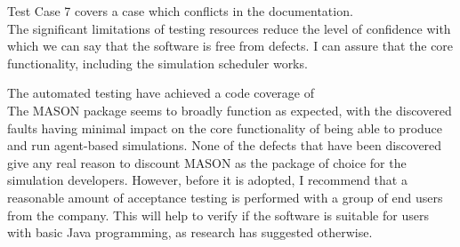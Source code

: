 \documentclass[11pt]{article}
\begin{document}
Test Case 7 covers a case which conflicts in the documentation.
\\

The significant limitations of testing resources reduce the level of confidence with which we can say that the software is free from defects.
I can assure that the core functionality, including the simulation scheduler works.

The automated testing have achieved a code coverage of 
\\



The MASON package seems to broadly function as expected, with the discovered faults having minimal impact on the core functionality of being able to produce and run agent-based simulations.
None of the defects that have been discovered give any real reason to discount MASON as the package of choice for the simulation developers.
However, before it is adopted, I recommend that a reasonable amount of acceptance testing is performed with a group of end users from the company.
This will help to verify if the software is suitable for users with basic Java programming, as research\cite{abm_platforms_review} has suggested otherwise.
\end{document}
